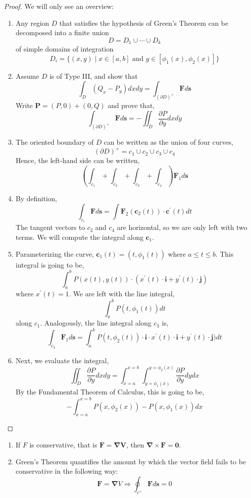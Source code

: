 \begin{proof}
	We will only see an overview:
	\begin{enumerate}
		\item Any region $D$ that satisfies the hypothesis of Green's Theorem can be decomposed into a finite union
		\[D = D_1 \cup \cdots \cup D_k\]
		of simple domains of integration
		\[D_i = \{(x, y) \mid x \in [a,b] \text{ and } y \in [\phi_1(x), \phi_2(x)]\}\]
		\item Assume $D$ is of Type III, and show that 
		\[\int_D\left(Q_x-P_y\right) d x d y = \int_{(\partial D)^+} \mathbf{F} d \mathbf{s}\]
		Write $\mathbf{P} = (P, 0) + (0, Q)$ and prove that,
		\[\int_{(\partial D)^+} \mathbf{F} d \mathbf{s} = -\iint_D \frac{\partial P}{\partial y} dx dy\]
		\item The oriented boundary of $D$ can be written as the union of four curves,
		\[(\partial D)^+ = c_1 \cup c_2 \cup c_3 \cup c_4\]
		Hence, the left-hand side can be written,
		\[\left(\int_{c_1} + \int_{c_2} + \int_{c_3} + \int_{c_4}\right) \mathbf{F}_1 d\mathbf{s}\]
		\item By definition,
		\[\int_{c_i} \mathbf{F} d \mathbf{s} = \int \mathbf{F}_2(\mathbf{c}_2(t)) \cdot \mathbf{c}^{\prime}(t) dt\]
		The tangent vectors to $c_2$ and $c_4$ are horizontal, so we are only left with two terms. We will compute the integral along $\mathbf{c}_1$.
		\item Parameterizing the curve, $\mathbf{c}_1(t) = (t, \phi_1(t))$ where $a \leq t \leq b$. This integral is going to be,
		\[\int_{a}^{b} P(x(t), y(t)) \cdot (x^{\prime}(t) \cdot \mathbf{i} + y^{\prime}(t) \cdot \mathbf{j})\]
		where $x^{\prime}(t) = 1$. We are left with the line integral,
		\[\int_a^b P(t, \phi_1(t)) dt\]
		along $c_1$. Analogously, the line integral along $c_3$ is,
		\[\int_{c_3} \mathbf{F}_1 d \mathbf{s} = \int_a^b P(t, \phi_2(t)) \cdot \mathbf{i} \cdot x^{\prime}(t) \cdot \mathbf{i} + y^{\prime}(t) \cdot \mathbf{j}) dt\]
		\item Next, we evaluate the integral, 
		\[\iint_D \frac{\partial P}{\partial y} dx dy = \int_{x = a}^{x = b} \int_{y = \phi_1(x)}^{y = \phi_2(x)} \frac{\partial P}{\partial y} dy dx\]
		By the Fundamental Theorem of Calculus, this is going to be,
		\[-\int_{x=a}^{x=b} P(x, \phi_2(x)) - P(x, \phi_1(x)) dx\]

	\end{enumerate}
\end{proof}

\begin{rmk}
	\hfill
	\begin{enumerate}
		\item If $F$ is conservative, that is $\mathbf{F} = \mathbf{\nabla{V}}$, then $\mathbf{\nabla} \times \mathbf{F} = \mathbf{0}$.
		\item Green's Theorem quantifies the amount by which the vector field fails to be conservative in the following way:
		\[\mathbf{F}=\mathbf{\nabla} V \Rightarrow \oint_{c^{+}} \mathbf{F} d \mathbf{s}=0\]
	\end{enumerate}
\end{rmk}

